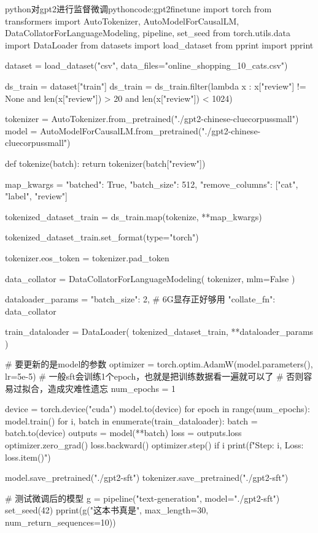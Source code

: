 \documentclass[lang=cn,newtx,10pt,scheme=chinese]{elegantbook}
\begin{document}
\begin{codebox}{python}{对gpt2进行监督微调}{pythoncode:gpt2finetune}
import torch
from transformers import AutoTokenizer, AutoModelForCausalLM, DataCollatorForLanguageModeling, pipeline, set_seed
from torch.utils.data import DataLoader
from datasets import load_dataset
from pprint import pprint

dataset = load_dataset("csv", data_files="online_shopping_10_cats.csv")

ds_train = dataset["train"]
ds_train = ds_train.filter(lambda x : x["review"] != None and len(x["review"]) > 20 and len(x["review"]) < 1024)

tokenizer = AutoTokenizer.from_pretrained("./gpt2-chinese-cluecorpussmall")
model = AutoModelForCausalLM.from_pretrained("./gpt2-chinese-cluecorpussmall")

def tokenize(batch):
    return tokenizer(batch["review"])

map_kwargs = {
    "batched": True,
    "batch_size": 512,
    "remove_columns": ["cat", "label", "review"]
}

tokenized_dataset_train = ds_train.map(tokenize, **map_kwargs)

tokenized_dataset_train.set_format(type="torch")

tokenizer.eos_token = tokenizer.pad_token

data_collator = DataCollatorForLanguageModeling(
    tokenizer,
    mlm=False
)

dataloader_params = {
    "batch_size": 2, # 6G显存正好够用
    "collate_fn": data_collator
}

train_dataloader = DataLoader(
    tokenized_dataset_train,
    **dataloader_params
)

# 要更新的是model的参数
optimizer = torch.optim.AdamW(model.parameters(), lr=5e-5)
# 一般sft会训练1个epoch，也就是把训练数据看一遍就可以了
# 否则容易过拟合，造成灾难性遗忘
num_epochs = 1

device = torch.device("cuda")
model.to(device)
for epoch in range(num_epochs):
    model.train()
    for i, batch in enumerate(train_dataloader):
        batch = batch.to(device)
        outputs = model(**batch)
        loss = outputs.loss
        optimizer.zero_grad()
        loss.backward()
        optimizer.step()
        if i %
            print(f"Step: {i}, Loss: {loss.item()}")

model.save_pretrained("./gpt2-sft")
tokenizer.save_pretrained("./gpt2-sft")

# 测试微调后的模型
g = pipeline("text-generation", model="./gpt2-sft")
set_seed(42)
pprint(g("这本书真是", max_length=30, num_return_sequences=10))
\end{codebox}
\end{document}

